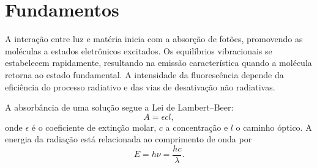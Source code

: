 \section{Fundamentos}
A intera\c{c}\~ao entre luz e mat\'eria inicia com a absor\c{c}\~ao de fot\~oes, promovendo as mol\'eculas a estados eletr\^onicos excitados. Os equil\'ibrios vibracionais se estabelecem rapidamente, resultando na emiss\~ao caracter\'istica quando a mol\'ecula retorna ao estado fundamental. A intensidade da fluoresc\^encia depende da efici\^encia do processo radiativo e das vias de desativa\c{c}\~ao n\~ao radiativas.

A absorb\^ancia de uma solu\c{c}\~ao segue a Lei de Lambert--Beer:
\begin{equation}
A = \epsilon c l,
\end{equation}
onde $\epsilon$ \'e o coeficiente de extin\c{c}\~ao molar, $c$ a concentra\c{c}\~ao e $l$ o caminho \'{o}ptico. A energia da radia\c{c}\~ao est\'a relacionada ao comprimento de onda por
\begin{equation}
E = h \nu = \frac{hc}{\lambda}.
\end{equation}
